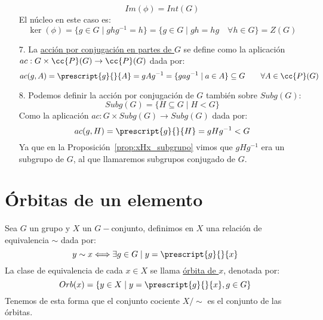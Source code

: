 \begin{ejemplo}
\begin{enumerate}
            \begin{equation*}
                Im(\phi) = Int(G)
            \end{equation*}
            El núcleo en este caso es:
            \begin{equation*}
                \ker(\phi) = \{g\in G \mid ghg^{-1} = h\} = \{g\in G \mid gh = hg \quad \forall h\in G\} = Z(G)
            \end{equation*}
        \item[7.] La \underline{acción por conjugación en partes de $G$} se define como la aplicación \newline $ac:G\times \cc{P}(G) \to \cc{P}(G)$ dada por:
            \begin{equation*}
                ac(g,A) = \prescript{g}{}{A} = gAg^{-1} = \{gag^{-1} \mid a\in A\} \subseteq G \qquad \forall A\in \cc{P}(G)
            \end{equation*}
        \item[8.] Podemos definir la acción por conjugación de $G$ también sobre $Subg(G)$:
            \begin{equation*}
                Subg(G) = \{H\subseteq G \mid H<G\}
            \end{equation*}
            Como la aplicación $ac:G\times Subg(G) \to Subg(G)$ dada por:
            \begin{equation*}
                ac(g,H) = \prescript{g}{}{H} = gHg^{-1} < G
            \end{equation*}
            Ya que en la Proposición~\ref{prop:xHx_subgrupo} vimos que $gHg^{-1}$ era un subgrupo de $G$, al que llamaremos subgrupos conjugado de $G$.
    \end{enumerate}
\end{ejemplo}


\section{Órbitas de un elemento}

\begin{definicion}[Órbita]
    Sea $G$ un grupo y $X$ un $G-$conjunto, definimos en $X$ una relación de equivalencia $\sim$ dada por:
    \begin{equation*}
        y\sim x \Longleftrightarrow \exists g\in G \mid y = \prescript{g}{}{x}
    \end{equation*}
    La clase de equivalencia de cada $x\in X$ se llama \underline{órbita de $x$}, denotada por:
    \begin{equation*}
        Orb(x) = \{y\in X \mid y=\prescript{g}{}{x}, g\in G\}
    \end{equation*}
    Tenemos de esta forma que el conjunto cociente $X/\sim$ es el conjunto de las órbitas.
\end{definicion}


